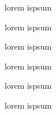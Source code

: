 


\label{0}

lorem ispsum{\bfseries
\begin{mydescription} lorem ispsum
\end{mydescription}
}

lorem ispsum{\bfseries
\begin{mydescription} lorem ispsum
\end{mydescription}
}
\begin{myquote}\item{} lorem ispsum
\end{myquote}

lorem ispsum




